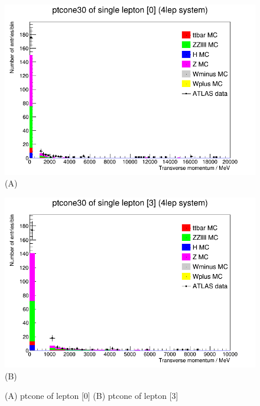 \begin{figure}[h!]
    \centering
    \begin{minipage}{0.5\textwidth}
        \centering
        \includegraphics[width=\linewidth]{plots/06-03-2021/07-28_06-03-21.png}
        (A)
    \end{minipage}\hfill
    \begin{minipage}{0.5\textwidth}
        \centering
        \includegraphics[width=\linewidth]{plots/06-03-2021/08-26_06-03-21.png}
        (B)
    \end{minipage}
    \caption{(A) ptcone of lepton [0] (B) ptcone of lepton [3]}
    \label{fig:07-28_06-03-21}
\end{figure}

